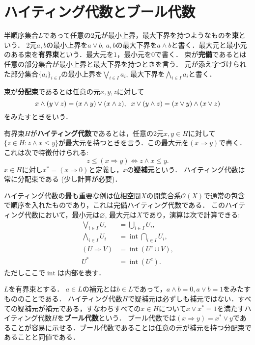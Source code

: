 \documentclass[uplatex,dvipdfmx]{jsarticle}
\newcommand{\intr}{\operatorname{int}}
\renewcommand\emptyset{\varnothing}
\theoremstyle{definition}
\begin{document}
\section{ハイティング代数とブール代数}

半順序集合$L$であって任意の2元が最小上界，最大下界を持つようなものを{\bfseries 束}という．
2元$a, b$の最小上界を$a \lor b$, $a, b$の最大下界を$a \land b$と書く．最大元と最小元のある束を{\bfseries 有界束}という．最大元を$1$，最小元を$0$で書く．
束が{\bfseries 完備}であるとは任意の部分集合が最小上界と最大下界を持つときを言う．
元が添え字づけられた部分集合$\{a_i\}_{i \in I}$の最小上界を$\bigvee_{i \in I} a_i$, 最大下界を$\bigwedge_{i \in I} a_i$と書く．

束が{\bfseries 分配束}であるとは任意の元$x, y, z$に対して
\[
x \land (y \lor z) = (x \land y) \lor (x \land z),\hspace{0.2cm}
x \lor (y \land z) = (x \lor y) \land (x \lor z)
\]
をみたすときをいう．


有界束$H$が{\bfseries ハイティング代数}であるとは，任意の2元$x, y \in H$に対して$\{ z \in H : z \land x \le y \}$が最大元を持つときを言う．この最大元を$(x \Rightarrow y)$で書く．これは次で特徴付けられる:
\[
z \le (x \Rightarrow y) \iff z \land x \le y.
\]
$x \in H$に対し$x^* = (x \Rightarrow 0)$と定義し，$x$の{\bfseries 疑補元}という．
ハイティング代数は常に分配束である (少し計算が必要)．

ハイティング代数の最も重要な例は位相空間$X$の開集合系$\mathcal{O}(X)$で通常の包含で順序を入れたものであり，これは完備ハイティング代数である．
このハイティング代数において，最小元は$\emptyset$, 最大元は$X$であり，演算は次で計算できる:
\begin{align*}
\bigvee_{i \in I} U_i &= \bigcup_{i \in I} U_i, \\
\bigwedge_{i \in I} U_i &= \intr \bigcap_{i \in I} U_i, \\
(U \Rightarrow V) &= \intr (U^c \cup V), \\
U^* &= \intr (U^c).
\end{align*}
ただしここで$\intr$は内部を表す．

$L$を有界束とする．
$a \in L$の補元とは$b \in L$であって，$a \land b = 0, a \lor b = 1$をみたすもののことである．
ハイティング代数$H$で疑補元は必ずしも補元ではない．すべての疑補元が補元である，すなわちすべての$x \in H$について$x \lor x^* = 1$を満たすハイティング代数$H$を{\bfseries ブール代数}という．
ブール代数では$(x \Rightarrow y) = x^* \lor y$であることが容易に示せる．ブール代数であることは任意の元が補元を持つ分配束であることと同値である．
\end{document}
